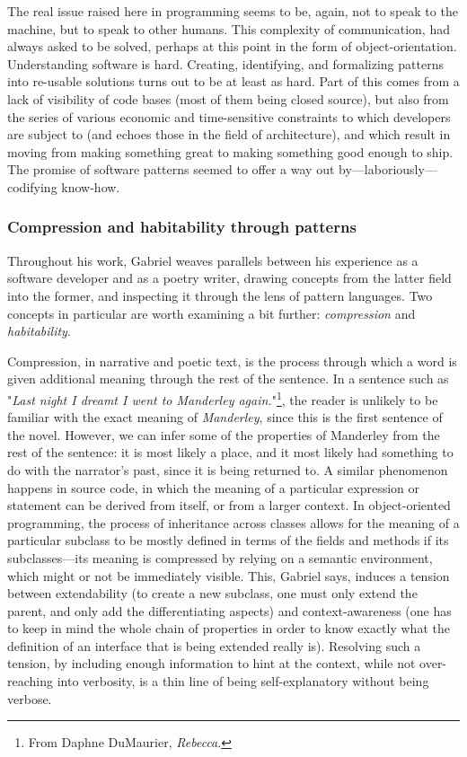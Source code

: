 \documentclass{article}
\begin{document}
The real issue raised here in programming seems to be, again, not to speak to the machine, but to speak to other humans. This complexity of communication, had always asked to be solved, perhaps at this point in the form of object-orientation. Understanding software is hard. Creating, identifying, and formalizing patterns into re-usable solutions turns out to be at least as hard\cite{taylor_patterns_2001}. Part of this comes from a lack of visibility of code bases (most of them being closed source), but also from the series of various economic and time-sensitive constraints to which developers are subject to (and echoes those in the field of architecture), and which result in moving from making something great to making something good enough to ship. The promise of software patterns seemed to offer a way out by—laboriously—codifying know-how.

\subsubsection{Compression and habitability through patterns}

Throughout his work, Gabriel weaves parallels between his experience as a software developer and as a poetry writer, drawing concepts from the latter field into the former, and inspecting it through the lens of pattern languages. Two concepts in particular are worth examining a bit further: \emph{compression} and \emph{habitability}.

Compression, in narrative and poetic text, is the process through which a word is given additional meaning through the rest of the sentence. In a sentence such as "\emph{Last night I dreamt I went to Manderley again.}"\footnote{From Daphne DuMaurier, \emph{Rebecca}.}, the reader is unlikely to be familiar with the exact meaning of \emph{Manderley}, since this is the first sentence of the novel. However, we can infer some of the properties of Manderley from the rest of the sentence: it is most likely a place, and it most likely had something to do with the narrator's past, since it is being returned to. A similar phenomenon happens in source code, in which the meaning of a particular expression or statement can be derived from itself, or from a larger context. In object-oriented programming, the process of inheritance across classes allows for the meaning of a particular subclass to be mostly defined in terms of the fields and methods if its subclasses—its meaning is compressed by relying on a semantic environment, which might or not be immediately visible. This, Gabriel says, induces a tension between extendability (to create a new subclass, one must only extend the parent, and only add the differentiating aspects) and context-awareness (one has to keep in mind the whole chain of properties in order to know exactly what the definition of an interface that is being extended really is). Resolving such a tension, by including enough information to hint at the context, while not over-reaching into verbosity, is a thin line of being self-explanatory without being verbose.
\end{document}
